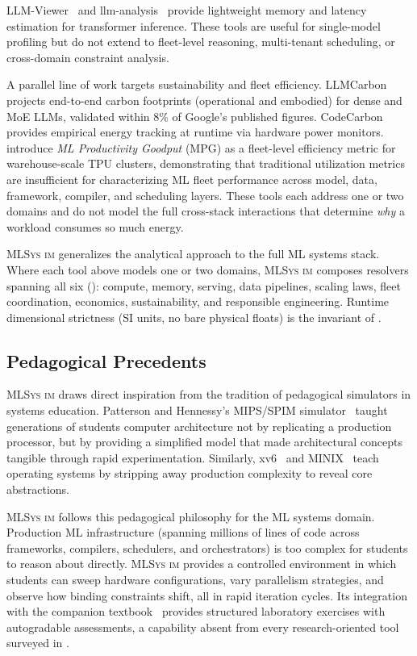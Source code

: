 \documentclass[10pt,twocolumn]{article}
\newcommand{\mlsysim}{\mbox{\textsc{MLSys}\,\textperiodcentered\,\textsc{im}}\xspace}
\begin{document}
LLM-Viewer~\citep{yuan2024llmviewer} and llm-analysis~\citep{kim2023llmanalysis} provide lightweight memory and latency estimation for transformer inference. These tools are useful for single-model profiling but do not extend to fleet-level reasoning, multi-tenant scheduling, or cross-domain constraint analysis.

A parallel line of work targets sustainability and fleet efficiency. LLMCarbon~\citep{faiz2024llmcarbon} projects end-to-end carbon footprints (operational and embodied) for dense and MoE LLMs, validated within 8\% of Google's published figures. CodeCarbon~\citep{lottick2019codecarbon} provides empirical energy tracking at runtime via hardware power monitors. \citet{wongpanich2025fleet} introduce \emph{ML Productivity Goodput} (MPG) as a fleet-level efficiency metric for warehouse-scale TPU clusters, demonstrating that traditional utilization metrics are insufficient for characterizing ML fleet performance across model, data, framework, compiler, and scheduling layers. These tools each address one or two domains and do not model the full cross-stack interactions that determine \emph{why} a workload consumes so much energy.

\mlsysim generalizes the analytical approach to the full ML systems stack. Where each tool above models one or two domains, \mlsysim composes resolvers spanning all six (): compute, memory, serving, data pipelines, scaling laws, fleet coordination, economics, sustainability, and responsible engineering. Runtime dimensional strictness (SI units, no bare physical floats) is the invariant of .

\subsection{Pedagogical Precedents}

\mlsysim draws direct inspiration from the tradition of pedagogical simulators in systems education. Patterson and Hennessy's MIPS/SPIM simulator~\citep{patterson2014organization} taught generations of students computer architecture not by replicating a production processor, but by providing a simplified model that made architectural concepts tangible through rapid experimentation. Similarly, xv6~\citep{cox2011xv6} and MINIX~\citep{tanenbaum2006minix} teach operating systems by stripping away production complexity to reveal core abstractions.

\mlsysim follows this pedagogical philosophy for the ML systems domain. Production ML infrastructure (spanning millions of lines of code across frameworks, compilers, schedulers, and orchestrators) is too complex for students to reason about directly. \mlsysim provides a controlled environment in which students can sweep hardware configurations, vary parallelism strategies, and observe how binding constraints shift, all in rapid iteration cycles. Its integration with the companion textbook~\citep{mlsysbook2025} provides structured laboratory exercises with autogradable assessments, a capability absent from every research-oriented tool surveyed in .
\end{document}
